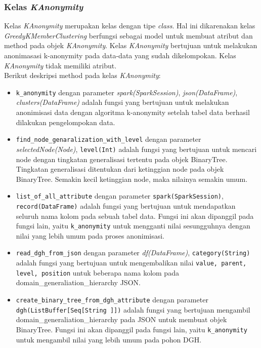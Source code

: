 \subsubsection{Kelas \textit{KAnonymity}}
Kelas \textit{KAnonymity} merupakan kelas dengan tipe \textit{class}. Hal ini dikarenakan kelas \textit{GreedyKMemberClustering} berfungsi sebagai model untuk membuat atribut dan method pada objek \textit{KAnonymity}. Kelas \textit{KAnonymity} bertujuan untuk melakukan anonimasasi k-anonymity pada data-data yang sudah dikelompokan. Kelas \textit{KAnonymity} tidak memiliki atribut.\\

\noindent \noindent Berikut deskripsi method pada kelas \textit{KAnonymity}:

\begin{itemize}

\item \texttt{k\_anonymity} dengan parameter \textit{spark(SparkSession)}, \textit{json(DataFrame)}, \textit{clusters(DataFrame)} adalah fungsi yang bertujuan untuk melakukan anonimisasi data dengan algoritma k-anonymity setelah tabel data berhasil dilakukan pengelompokan data.

\item \texttt{find\_node\_genaralization\_with\_level} dengan parameter \textit{selectedNode(Node)}, \texttt{level(Int)} adalah fungsi yang bertujuan untuk mencari node dengan tingkatan generalisasi tertentu pada objek BinaryTree. Tingkatan generalisasi ditentukan dari ketinggian node pada objek BinaryTree. Semakin kecil ketinggian node, maka nilainya semakin umum.

\item \texttt{list\_of\_all\_attribute} dengan parameter \texttt{spark(SparkSession)}, \texttt{record(DataFrame)} adalah fungsi yang bertujuan untuk mendapatkan seluruh nama kolom pada sebuah tabel data. Fungsi ini akan dipanggil pada fungsi lain, yaitu \texttt{k\_anonymity} untuk mengganti nilai sesungguhnya dengan nilai yang lebih umum pada proses anonimisasi.

\item \texttt{read\_dgh\_from\_json} dengan parameter \textit{df(DataFrame)}, \texttt{category(String)} adalah fungsi yang bertujuan untuk mengembalikan nilai \texttt{value, parent, level, position} untuk beberapa nama kolom pada domain\_generaliation\_hierarchy JSON.

\item \texttt{create\_binary\_tree\_from\_dgh\_attribute} dengan parameter \texttt{dgh(ListBuffer[Seq[String ]])} adalah fungsi yang bertujuan mengambil domain\_generaliation\_hierarchy pada JSON untuk membuat objek BinaryTree. Fungsi ini akan dipanggil pada fungsi lain, yaitu \texttt{k\_anonymity} untuk mengambil nilai yang lebih umum pada pohon DGH.

\end{itemize}


